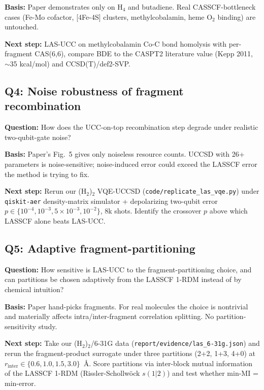 \textbf{Basis:} Paper demonstrates only on H$_4$ and butadiene. Real CASSCF-bottleneck cases (Fe-Mo cofactor, [4Fe-4S] clusters, methylcobalamin, heme O$_2$ binding) are untouched.

\textbf{Next step:} LAS-UCC on methylcobalamin Co-C bond homolysis with per-fragment CAS(6,6), compare BDE to the CASPT2 literature value (Kepp 2011, $\sim$35 kcal/mol) and CCSD(T)/def2-SVP.

\subsection*{Q4: Noise robustness of fragment recombination}
\textbf{Question:} How does the UCC-on-top recombination step degrade under realistic two-qubit-gate noise?

\textbf{Basis:} Paper's Fig.~5 gives only noiseless resource counts. UCCSD with 26+ parameters is noise-sensitive; noise-induced error could exceed the LASSCF error the method is trying to fix.

\textbf{Next step:} Rerun our (H$_2$)$_2$ VQE-UCCSD (\texttt{code/replicate\_las\_vqe.py}) under \texttt{qiskit-aer} density-matrix simulator + depolarizing two-qubit error $p \in \{10^{-4},10^{-3},5{\times}10^{-3},10^{-2}\}$, 8k shots. Identify the crossover $p$ above which LASSCF alone beats LAS-UCC.

\subsection*{Q5: Adaptive fragment-partitioning}
\textbf{Question:} How sensitive is LAS-UCC to the fragment-partitioning choice, and can partitions be chosen adaptively from the LASSCF 1-RDM instead of by chemical intuition?

\textbf{Basis:} Paper hand-picks fragments. For real molecules the choice is nontrivial and materially affects intra/inter-fragment correlation splitting. No partition-sensitivity study.

\textbf{Next step:} Take our (H$_2$)$_2$/6-31G data (\texttt{report/evidence/las\_6-31g.json}) and rerun the fragment-product surrogate under three partitions (2+2, 1+3, 4+0) at $r_{\text{inter}} \in \{0.6, 1.0, 1.5, 3.0\}$~\AA. Score partitions via inter-block mutual information of the LASSCF 1-RDM (Rissler-Schollw\"ock $s(1|2)$) and test whether min-MI = min-error.
